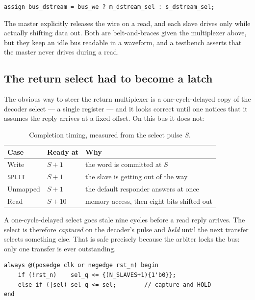 \documentclass[11pt,a4paper]{article}
\newcommand{\sig}[1]{\texttt{#1}}
\begin{document}
\begin{lstlisting}
assign bus_dstream = bus_we ? m_dstream_sel : s_dstream_sel;
\end{lstlisting}

The master explicitly releases the wire on a read, and each slave drives only
while actually shifting data out. Both are belt-and-braces given the
multiplexer above, but they keep an idle bus readable in a waveform, and a
testbench asserts that the master never drives during a read.

\subsection{The return select had to become a latch}
\label{sec:latch}

The obvious way to steer the return multiplexer is a one-cycle-delayed copy
of the decoder select --- a single register --- and it looks correct until
one notices that it assumes the reply arrives at a fixed offset. On this bus
it does not:

\begin{table}[htb]
\centering\small
\caption{Completion timing, measured from the select pulse $S$.}
\begin{tabular}{@{}lll@{}}
\toprule
\textbf{Case} & \textbf{Ready at} & \textbf{Why}\\
\midrule
Write       & $S{+}1$  & the word is committed at $S$\\
\sig{SPLIT} & $S{+}1$  & the slave is getting out of the way\\
Unmapped    & $S{+}1$  & the default responder answers at once\\
Read        & $S{+}10$ & memory access, then eight bits shifted out\\
\bottomrule
\end{tabular}
\end{table}

A one-cycle-delayed select goes stale nine cycles before a read reply
arrives. The select is therefore \emph{captured} on the decoder's pulse and
\emph{held} until the next transfer selects something else. That is safe
precisely because the arbiter locks the bus: only one transfer is ever
outstanding.

\begin{lstlisting}
always @(posedge clk or negedge rst_n) begin
    if (!rst_n)    sel_q <= {(N_SLAVES+1){1'b0}};
    else if (|sel) sel_q <= sel;        // capture and HOLD
end
\end{lstlisting}
\end{document}
